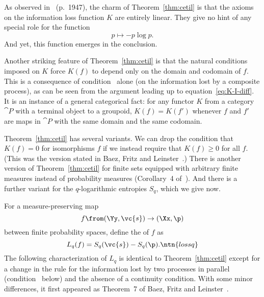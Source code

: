 As observed in~\cite{CETIL} (p.~1947), the charm of Theorem~\ref{thm:cetil}
is that the axioms on the information loss function $K$ are entirely
linear.  They give no hint of any special role for the function
\[
p \mapsto -p \log p.
\]
And yet, this function emerges in the conclusion.

Another striking feature of Theorem~\ref{thm:cetil} is that the natural
conditions imposed on $K$ force $K(f)$ to depend only on the domain and
codomain of $f$.  This is a consequence of condition~ alone
(on the information lost by a composite process), as can be seen from the
argument leading up to equation~\eqref{eq:K-I-diff}.  It is an instance of
a general categorical fact: for any functor $K$ from a category $\cat{P}$
with a terminal object to a groupoid, $K(f) = K(f')$ whenever $f$
and $f'$ are maps in $\cat{P}$ with the same domain and the same codomain.

Theorem~\ref{thm:cetil} has several variants.  We can drop the condition
that $K(f) = 0$ for isomorphisms $f$ if we instead require that $K(f) \geq
0$ for all $f$.  (This was the version stated in Baez, Fritz and
Leinster~\cite{CETIL}.)  There is another version of
Theorem~\ref{thm:cetil} for finite sets equipped with arbitrary finite
measures instead of probability measures (Corollary~4 of~\cite{CETIL}).
And there is a further variant for the $q$-logarithmic entropies $S_q$,
which we give now.

For a measure-preserving map
\[
f \from (\Yy, \vc{s}) \to (\Xx, \p)
\]
between finite probability spaces, define the  of $f$ as
\[
L_q(f) = S_q(\vc{s}) - S_q(\p).
\ntn{lossq}
\]
The following characterization of $L_q$ 
is identical to Theorem~\ref{thm:cetil} except for a change in the rule for
the information lost by two processes in parallel (condition~
below) and the absence of a continuity condition.  With some minor
differences, it first appeared as Theorem~7 of Baez, Fritz and
Leinster~\cite{CETIL}.

